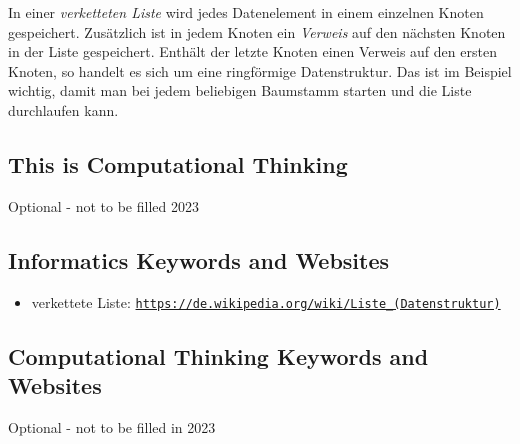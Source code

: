 \documentclass[a4paper,11pt]{report}
\newcommand{\BrochureUrlText}[1]{\texttt{#1}}
\newcommand{\taskGraphicsFolder}{..}
\begin{document}
{\centering%
\par}

In einer \emph{verketteten Liste} wird jedes Datenelement in einem einzelnen Knoten gespeichert. Zusätzlich ist in jedem Knoten ein \emph{Verweis} auf den nächsten Knoten in der Liste gespeichert. Enthält der letzte Knoten einen Verweis auf den ersten Knoten, so handelt es sich um eine ringförmige Datenstruktur. Das ist im Beispiel wichtig, damit man bei jedem beliebigen Baumstamm starten und die Liste durchlaufen kann.


\subsection*{This is Computational Thinking}

Optional - not to be filled 2023


\subsection*{Informatics Keywords and Websites}

\begin{itemize}
  \item verkettete Liste: \href{https://de.wikipedia.org/wiki/Liste_(Datenstruktur)}{\BrochureUrlText{https://de.wikipedia.org/wiki/Liste\_(Datenstruktur)}}
\end{itemize}


\subsection*{Computational Thinking Keywords and Websites}

Optional - not to be filled in 2023
\end{document}
